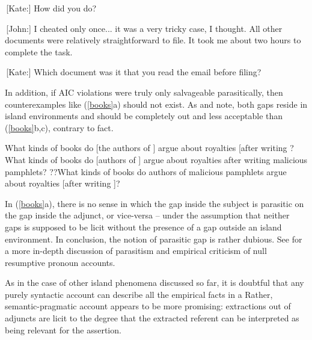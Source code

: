\documentclass[output=paper]{langsci/langscibook}
\begin{document}
 \,[Kate:]  How did you do? 

 \,[John:]  I cheated only once... it was a very tricky case, I thought. All other
documents were relatively straightforward to file. It took me about two hours to complete the task.

 \,[Kate:]  Which document was it that you read the email before filing? 
\z

In addition, if AIC violations were truly only salvageable parasitically, then counterexamples
like (\ref{books}a) should not exist.  As 
\citet{Levine:Sag:03} and
\citet[256]{levhubook}
note, both gaps reside in island environments and should be 
completely out and less acceptable than (\ref{books}b,c), contrary to fact.

\ea
\ea What kinds of books do [the authors of \spc] argue about royalties [after writing \spc?
\ex \bad{*}What kinds of books do [authors of \spc] argue about royalties after writing malicious pamphlets?
\ex ??What kinds of books do authors of malicious pamphlets argue about royalties
[after writing \spc]?
\z \label{books}
\z

\noindent
In (\ref{books}a), there is no sense in which the gap inside the subject is parasitic on the gap inside the  adjunct, or vice-versa -- under the assumption that neither gaps is supposed to be licit without  the presence of a gap outside an island environment. In conclusion, the notion of parasitic 
gap is rather dubious. See \citet[??]{levhubook} for a more in-depth discussion of parasitism and 
empirical criticism of null resumptive pronoun accounts.

As in the case of other island phenomena discussed so far, it is doubtful  that any purely syntactic account can describe all the empirical facts in a Rather, semantic-pragmatic account  appears to be more promising: extractions out of adjuncts are licit to the degree that the extracted
referent can be interpreted as being relevant for the assertion.



\end{document}
